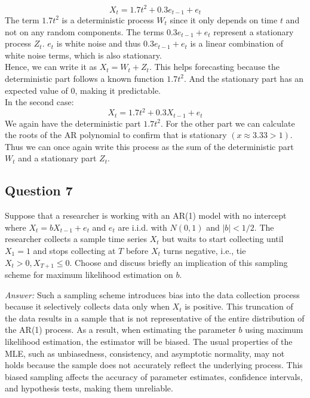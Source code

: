 \begin{footnotesize}
    \[
    X_t = 1.7t^2 + 0.3 e_{t-1} + e_t
    \] The term $1.7t^2$ is a deterministic process $W_t$ since it only depends on time $t$ and not on any random components. The terms $0.3e_{t-1} +e_t$ represent a stationary process $Z_t$. $e_t$ is white noise and thus $0.3e_{t-1} + e_t$ is a linear combination of white noise terms, which is also stationary. \\

    Hence, we can write it as $X_t = W_t + Z_t$. This helps forecasting because the deterministic part follows a known function $1.7t^2$. And the stationary part has an expected value of 0, making it predictable.\\

    In the second case: \[
    X_t = 1.7t^2 + 0.3X_{t-1} + e_t
    \] We again have the deterministic part $1.7t^2$. For the other part we can calculate the roots of the AR polynomial to confirm that is stationary $(x\approx 3.33 > 1)$. Thus we can once again write this process as the sum of the deterministic part $W_t$ and a stationary part $Z_t$.
\end{footnotesize}

\subsection*{Question 7}

Suppose that a researcher is working with an AR(1) model with no intercept where $X_t=bX_{t-1}+e_t$ and $e_t$ are i.i.d. with $N(0,1)$ and $|b|<1/2$. The researcher collects a sample time series $X_t$ but waits to start collecting until $X_1=1$ and stops collecting at $T$ before $X_t$ turns negative, i.e., tie $X_t>0, X_{T+1}\leq 0$. Choose and discuss briefly an implication of this sampling scheme for maximum likelihood estimation on $b$. \\

\begin{footnotesize}
    \textit{Answer:} Such a sampling scheme introduces bias into the data collection process because it selectively collects data only when $X_t$ is positive. This truncation of the data results in a sample that is not representative of the entire distribution of the AR(1) process. As a result, when estimating the parameter $b$ using maximum likelihood estimation, the estimator will be biased. The usual properties of the MLE, such as unbiasedness, consistency, and asymptotic normality, may not holds because the sample does not accurately reflect the underlying process. This biased sampling affects the accuracy of parameter estimates, confidence intervals, and hypothesis tests, making them unreliable.
\end{footnotesize}